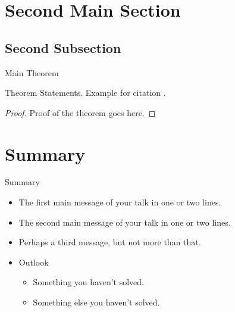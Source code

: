 \documentclass[xcolor=dvipsnames]{beamer}
\begin{document}
\section{Second Main Section}

\subsection{Second Subsection}
\begin{frame}{Main Theorem}
\begin{theorem}
Theorem Statements. Example for citation \cite{Author1990}.
\end{theorem}

\begin{proof}
Proof of the theorem goes here.
\end{proof}
\end{frame}

\section*{Summary}

\begin{frame}{Summary}
  \begin{itemize}
  \item
    The \alert{first main message} of your talk in one or two lines.
  \item
    The \alert{second main message} of your talk in one or two lines.
  \item
    Perhaps a \alert{third message}, but not more than that.
  \end{itemize}
  
  \begin{itemize}
  \item
    Outlook
    \begin{itemize}
    \item
      Something you haven't solved.
    \item
      Something else you haven't solved.
    \end{itemize}
  \end{itemize}
\end{frame}

\end{document}
